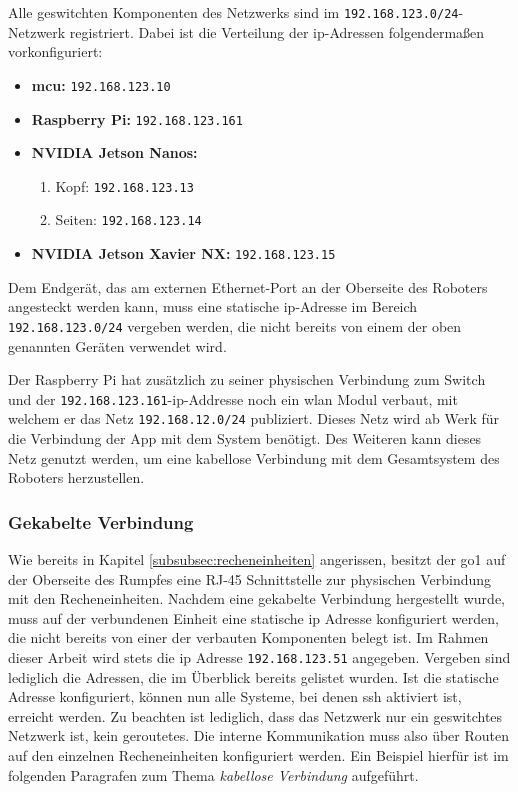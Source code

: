Alle geswitchten Komponenten des Netzwerks sind im \texttt{192.168.123.0/24}-Netzwerk registriert.
Dabei ist die Verteilung der \gls{ip}-Adressen folgendermaßen vorkonfiguriert:
\begin{itemize}
    \item \textbf{\gls{mcu}:} \texttt{192.168.123.10}
    \item \textbf{Raspberry Pi:} \texttt{192.168.123.161}
    \item \textbf{NVIDIA Jetson Nanos:}
    \begin{enumerate}
        \item Kopf: \texttt{192.168.123.13}
        \item Seiten: \texttt{192.168.123.14}
    \end{enumerate}
    \item \textbf{NVIDIA Jetson Xavier NX:} \texttt{192.168.123.15}
\end{itemize}
Dem Endgerät, das am externen Ethernet-Port an der Oberseite des Roboters angesteckt werden kann,
muss eine statische \gls{ip}-Adresse im Bereich \texttt{192.168.123.0/24} vergeben werden, die nicht bereits von einem der oben genannten
Geräten verwendet wird.

Der Raspberry Pi hat zusätzlich zu seiner physischen Verbindung zum Switch und der \texttt{192.168.123.161}-\gls{ip}-Addresse
noch ein \gls{wlan} Modul verbaut, mit welchem er das Netz \texttt{192.168.12.0/24} publiziert.
Dieses Netz wird ab Werk für die Verbindung der App mit dem System benötigt.
Des Weiteren kann dieses Netz genutzt werden, um eine kabellose Verbindung mit dem Gesamtsystem
des Roboters herzustellen.

\subsubsection{Gekabelte Verbindung}

Wie bereits in Kapitel \ref{subsubsec:recheneinheiten} angerissen, besitzt der \gls{go1} auf der Oberseite des Rumpfes
eine RJ-45 Schnittstelle zur physischen Verbindung mit den Recheneinheiten.
Nachdem eine gekabelte Verbindung hergestellt wurde, muss auf der verbundenen Einheit eine statische \gls{ip} Adresse
konfiguriert werden, die nicht bereits von einer der verbauten Komponenten belegt ist.
Im Rahmen dieser Arbeit wird stets die \gls{ip} Adresse \texttt{192.168.123.51} angegeben.
Vergeben sind lediglich die Adressen, die im Überblick bereits gelistet wurden.
Ist die statische Adresse konfiguriert, können nun alle Systeme, bei denen \gls{ssh} aktiviert ist, erreicht werden.
Zu beachten ist lediglich, dass das Netzwerk nur ein geswitchtes Netzwerk ist, kein geroutetes.
Die interne Kommunikation muss also über Routen auf den einzelnen Recheneinheiten konfiguriert werden.
Ein Beispiel hierfür ist im folgenden Paragrafen zum Thema \emph{kabellose Verbindung} aufgeführt.

